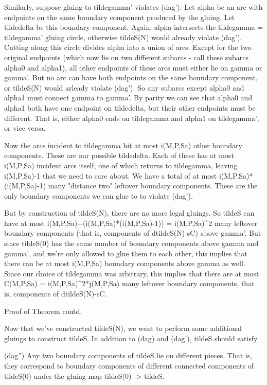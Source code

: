 \documentclass[12pt]{amsart}
\theoremstyle{definition}
\theoremstyle{remark}
\begin{document}
Similarly, suppose gluing to tildegamma' violates (dag'). Let alpha be an arc
with endpoints on the same boundary component produced by the gluing. Let
tildedelta be this boundary component. Again, alpha intersects the tildegamma
= tildegamma' gluing circle, otherwise tildeS(N) would already violate (dag').
Cutting along this circle divides alpha into a union of arcs. Except for the
two original endpoints (which now lie on two different subarcs - call these
subarcs alpha0 and alpha1), all other endpoints of these arcs must either lie
on gamma or gamma'.  But no arc can have both endpoints on the same boundary
component, or tildeS(N) would arleady violate (dag'). So any subarcs except
alpha0 and alpha1 must connect gamma to gamma'. By parity we can see that
alpha0 and alpha1 both have one endpoint on tildedelta, but their other
endpoints must be different. That is, either alpha0 ends on tildegamma and
alpha1 on tildegamma', or vice versa.

Now the arcs incident to tildegamma hit at most i(M,P,Sa) other boundary
components. These are our possible tildedelta. Each of these has at most
i(M,P,Sa) incident arcs itself, one of which returns to tildegamma, leaving
i(M,P,Sa)-1 that we need to care about. We have a total of at most
i(M,P,Sa)*(i(M,P,Sa)-1) many "distance two" leftover boundary components. These
are the only boundary components we can glue to to violate (dag').

But by construction of tildeS(N), there are no more legal gluings. So tildeS
can have at most i(M,P,Sa)+(i(M,P,Sa)*(i(M,P,Sa)-1)) = i(M,P,Sa)^2 many
leftover boundary components (that is, components of dtildeS(N)-sC) above
gamma'.  But since tildeS(0) has the same number of boundary components above
gamma and gamma', and we're only allowed to glue them to each other, this
implies that there can be at most i(M,P,Sa) boundary components above gamma as
well.  Since our choice of tildegamma was arbitrary, this implies that there
are at most C(M,P,Sa) = i(M,P,Sa)^2*j(M,P,Sa) many leftover boundary
components, that is, components of dtildeS(N)-sC.

Proof of Theorem contd.

Now that we've constructed tildeS(N), we want to perform some additional
gluings to construct tildeS. In addition to (dag) and (dag'), tildeS should
satisfy

(dag'') Any two boundary components of tildeS lie on different pieces. That is,
they correspond to boundary components of different connected components of
tildeS(0) under the gluing map tildeS(0) -> tildeS.
\end{document}
